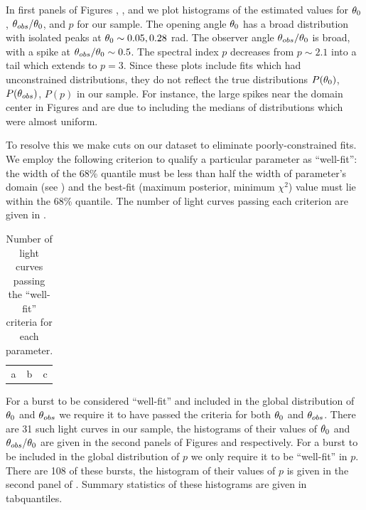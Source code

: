 In first panels of Figures , , and  we plot histograms of the estimated values for $\theta_0$, $\theta_{obs}/\theta_0$, and $p$ for our sample.  The opening angle $\theta_0$ has a broad distribution with isolated peaks at $\theta_0 \sim 0.05, 0.28$ rad.  The observer angle $\theta_{obs} / \theta_0$ is broad, with a spike at $\theta_{obs}/\theta_0 \sim 0.5$. The spectral index $p$ decreases from $p\sim 2.1$ into a tail which extends to $p=3$.  Since these plots include fits which had unconstrained distributions, they do not reflect the true distributions $P(\theta_0)$, $P(\theta_{obs})$, $P(p)$ in our sample.  For instance, the large spikes near the domain center in Figures  and  are due to including the medians of distributions which were almost uniform.   

To resolve this we make cuts on our dataset to eliminate poorly-constrained fits.  We employ the following criterion to qualify a particular parameter as ``well-fit'': the width of the 68\% quantile must be less than half the width of parameter's domain (see ) and the best-fit (maximum posterior, minimum $\chi^2$) value must lie within the 68\% quantile.  The number of light curves passing each criterion are given in .

\begin{table}
\begin{center}
\begin{tabular}{ccc}
a & b & c
\end{tabular}
\end{center}
\caption{Number of light curves passing the ``well-fit'' criteria for each parameter.  }
\end{table}


For a burst to be considered ``well-fit'' and included in the global distribution of $\theta_0$ and $\theta_{obs}$ we require it to have passed the criteria for both $\theta_0$ and $\theta_{obs}$.  There are 31 such light curves in our sample, the histograms of their values of $\theta_0$ and $\theta_{obs} / \theta_0$ are given in the second panels of Figures  and  respectively.  For a burst to be included in the global distribution of $p$ we only require it to be ``well-fit'' in $p$.  There are 108 of these bursts, the histogram of their values of $p$ is given in the second panel of .  Summary statistics of these histograms are given in tab{quantiles}.

